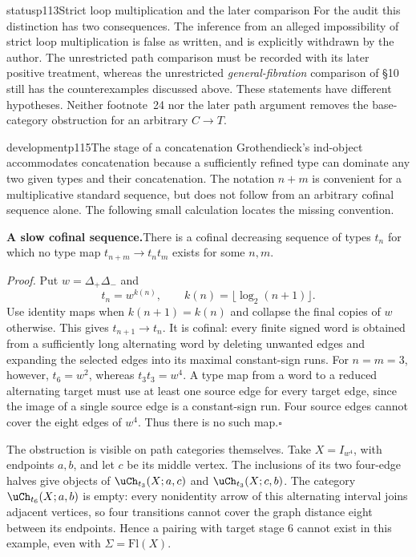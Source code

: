 \begin{dcomment}{status}{p113}{Strict loop multiplication and the later comparison}
For the audit this distinction has two consequences.  The inference from an alleged impossibility of strict loop multiplication is false as written, and is explicitly withdrawn by the author.  The unrestricted path comparison must be recorded with its later positive treatment, whereas the unrestricted \emph{general-fibration} comparison of \S10 still has the counterexamples discussed above.  These statements have different hypotheses.  Neither footnote~24 nor the later path argument removes the base-category obstruction for an arbitrary $C\to T$.
\end{dcomment}

\begin{dcomment}{development}{p115}{The stage of a concatenation}
Grothendieck's ind-object accommodates concatenation because a sufficiently refined type can dominate any two given types and their concatenation. The notation $n+m$ is convenient for a multiplicative standard sequence, but does not follow from an arbitrary cofinal sequence alone. The following small calculation locates the missing convention.

\textbf{A slow cofinal sequence.}\ours\quad There is a cofinal decreasing sequence of types $t_n$ for which no type map $t_{n+m}\to t_nt_m$ exists for some $n,m$.

\emph{Proof.} Put $w=\Delta_+\Delta_-$ and
\[
 t_n=w^{k(n)},\qquad k(n)=\lfloor\log_2(n+1)\rfloor.
\]
Use identity maps when $k(n+1)=k(n)$ and collapse the final copies of $w$ otherwise. This gives $t_{n+1}\to t_n$. It is cofinal: every finite signed word is obtained from a sufficiently long alternating word by deleting unwanted edges and expanding the selected edges into its maximal constant-sign runs. For $n=m=3$, however, $t_6=w^2$, whereas $t_3t_3=w^4$. A type map from a word to a reduced alternating target must use at least one source edge for every target edge, since the image of a single source edge is a constant-sign run. Four source edges cannot cover the eight edges of $w^4$. Thus there is no such map.\hfill$\square$

The obstruction is visible on path categories themselves. Take $X=I_{w^4}$, with endpoints $a,b$, and let $c$ be its middle vertex. The inclusions of its two four-edge halves give objects of $\uCh_{t_3}(X;a,c)$ and $\uCh_{t_3}(X;c,b)$. The category $\uCh_{t_6}(X;a,b)$ is empty: every nonidentity arrow of this alternating interval joins adjacent vertices, so four transitions cannot cover the graph distance eight between its endpoints. Hence a pairing with target stage $6$ cannot exist in this example, even with $\Sigma=\mathrm{Fl}(X)$.


\end{dcomment}
